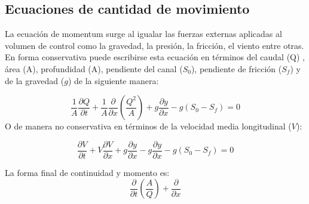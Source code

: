 \subsection{Ecuaciones de cantidad de movimiento}

La ecuación de momentum surge al igualar las fuerzas externas aplicadas al
volumen de control como la gravedad, la presión, la fricción, el viento entre
otras. En forma conservativa puede escribirse esta ecuación en términos del
caudal (Q) , área (A), profundidad (A), pendiente del canal ($S_0$),
pendiente de fricción ($S_f$)  y de la gravedad ($g$) de la siguiente manera:

\begin{equation}
    \frac{1}{A} \frac{\partial Q}{\partial t} + \frac{1}{A} \frac{\partial }{\partial x} \left(\frac{Q^2}{A}\right) + g \frac{\partial y}{\partial x} - g\left(S_0 - S_f \right) = 0
\end{equation}
O de manera no conservativa en términos de la velocidad media longitudinal ($V$):

\begin{equation}
    \frac{\partial V}{\partial t} + V \frac{\partial V}{\partial x} + g \frac{\partial y}{\partial x} - g \frac{\partial y}{\partial x} - g\left(S_0 - S_f \right) = 0
\end{equation}

La forma final de continuidad y momento es:
\begin{equation}
    \frac{\partial }{\partial t} \left(\frac{A}{Q}  \right) + \frac{\partial }{\partial x} 
\end{equation}






